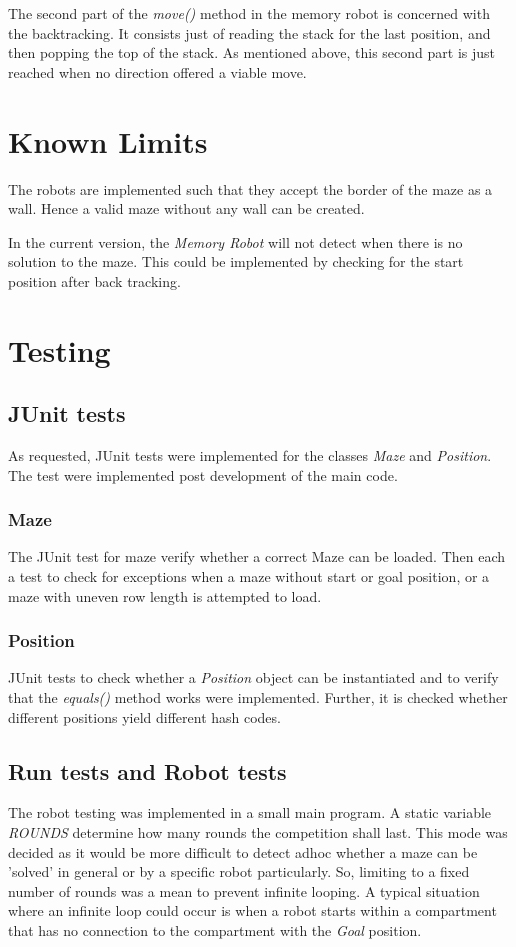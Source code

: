 \documentclass[a4paper,11pt,twoside]{article}
\begin{document}
The second part of the \textit{move()} method in the memory robot is
concerned with the backtracking. It consists just of reading the stack
for the last position, and then popping the top of the stack. As
mentioned above, this second part is just reached when no direction
offered a viable move. 



\section{Known Limits}
The robots are implemented such that they accept the border of the
maze as a wall. Hence a valid maze without any wall can be created.

In the current version, the \textit{Memory Robot} will not detect when
there is no solution to the maze. This could be implemented by
checking for the start position after back tracking.

\section{Testing}
\subsection{JUnit tests}
As requested, JUnit tests were implemented for the classes
\textit{Maze} and \textit{Position}. The test were implemented post
development of the main code.

\subsubsection{Maze}
The JUnit test for maze verify whether a correct Maze can be
loaded. Then each a test to check for exceptions when a maze without
start or goal position, or a maze with uneven row length is attempted
to load. 

\subsubsection{Position}
JUnit tests to check whether a \textit{Position} object can be
instantiated and to verify that the \textit{equals()} method works
were implemented. Further, it is checked whether different positions
yield different hash codes. 

\subsection{Run tests and Robot tests}
The robot testing was implemented in a small main program. A static
variable \textit{ROUNDS} determine how many rounds the competition
shall last. This mode was decided as it would be more difficult to
detect adhoc whether a maze can be 'solved' in general or by a
specific robot particularly. So, limiting to a fixed number of rounds
was a mean to prevent infinite looping. A typical situation where
an infinite loop could occur is when a robot starts within a
compartment that has no connection to the compartment with the
\textit{Goal} position.
\end{document}
